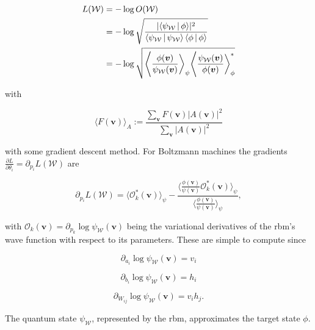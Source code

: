 \begin{align}
    L(\mathcal{W}) &= -\log{O(\mathcal{W})} \\
                   &= -\log{\sqrt{\frac{\lvert \Braket{\psi_{\mathcal{W}}|\phi} \rvert^2}{\Braket{\psi_{\mathcal{W}}|\psi_{\mathcal{W}}} \Braket{\phi|\phi}}}}\\
                   &= -\log{\sqrt{\Bigg\langle \frac{\phi(\bm{v})}{\psi_{\mathcal{W}}(\bm{v})} \bigg \rangle_{\psi} \Bigg\langle \frac{\psi_{\mathcal{W}}(\bm{v})}{\phi(\bm{v})} \bigg \rangle_{\phi}^{*}}}
\end{align}

with

\begin{equation}
    \langle F(\bm{v})\rangle_A := \frac{\sum_{\bm{v}} F(\bm{v}) \lvert A(\bm{v}) \rvert^2}{\sum_{\bm{v}} \lvert A(\bm{v})\rvert^2}
\end{equation}

with some gradient descent method. For Boltzmann machines the gradients $\frac{\partial L}{\partial \theta_i} = \partial_{p_i}L(\mathcal{W})$ are

\begin{equation}
   \label{eq:lossgrad}
   \partial_{p_i}L(\mathcal{W}) = \langle \mathcal{O}_k^*(\bm{v}) \rangle_{\psi} - \frac{\langle \frac{\phi(\bm{v})}{\psi(\bm{v})} \mathcal{O}_k^*(\bm{v})\rangle_{\psi}}{\langle \frac{\phi(\bm{v})}{\psi(\bm{v})} \rangle_{\psi}},
\end{equation}

with $\mathcal{O}_k(\bm{v}) = \partial_{p_k}\log{\psi_{\mathcal{W}}(\bm{v})}$ being the variational derivatives of the \gls{rbm}'s wave function with respect to its parameters.
These are simple to compute since

\begin{equation}
    \partial_{a_i}\log{\psi_{\mathcal{W}}(\bm{v})} = v_i
\end{equation}

\begin{equation}
    \partial_{b_i}\log{\psi_{\mathcal{W}}(\bm{v})} = h_i
\end{equation}

\begin{equation}
    \partial_{W_{ij}}\log{\psi_{\mathcal{W}}(\bm{v})} = v_ih_j.
\end{equation}

The quantum state $\psi_{\mathcal{W}}$, represented by the \gls{rbm}, approximates the target state $\phi$. 

